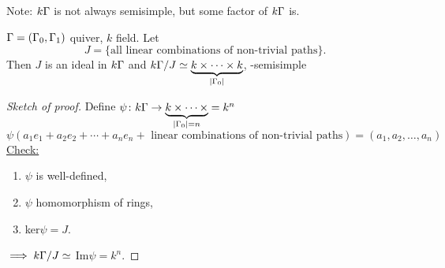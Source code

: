 Note: $k\Gamma$ is not always semisimple, but some factor of $k\Gamma$ is.

\begin{prop}
  $\Gamma=(\Gamma_0,\Gamma_1) $ quiver, $k$ field. Let
\[J = \{\text{all linear combinations of non-trivial paths}\}.\] 
Then $J$ is an ideal in $k\Gamma$ and
  $k\Gamma/J \simeq \underbrace{k \times \cdots \times k}_{|\Gamma_0|}$,
  -semisimple
\end{prop}
\begin{proof}[Sketch of proof]
  Define $\psi\colon k\Gamma \rightarrow \underbrace{k \times \cdots \times}_{|\Gamma_0|=n} = k^n $
\[\psi(a_1e_1 + a_2e_2 + \cdots + a_ne_n + \text{ linear combinations
    of non-trivial paths} ) = (a_1, a_2,\ldots, a_n)\]
  \underline{Check:} \begin{enumerate}
		\item  $\psi$ is well-defined,
		\item $\psi$ homomorphism of rings,
		\item ker$\psi=J$. 
	\end{enumerate}
	$\implies k\Gamma/J \simeq$ Im$\psi=k^n$.
\end{proof}
